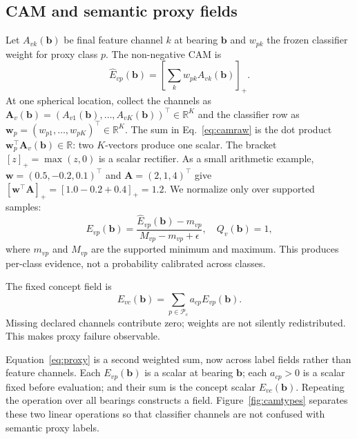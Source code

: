 \documentclass[a4paper,9pt]{extarticle}
\newcommand{\R}{\mathbb R}
\begin{document}
\subsection{CAM and semantic proxy fields}

Let $A_{vk}(\mathbf b)$ be final feature channel $k$ at bearing $\mathbf b$ and $w_{pk}$ the frozen classifier weight for proxy class $p$. The non-negative CAM is
\begin{equation}
 \widehat E_{vp}(\mathbf b)=
 \left[\sum_k w_{pk}A_{vk}(\mathbf b)\right]_+.
 \label{eq:camraw}
\end{equation}
At one spherical location, collect the channels as
$\mathbf A_v(\mathbf b)=(A_{v1}(\mathbf b),\ldots,A_{vK}(\mathbf b))^\top\in\R^K$ and the classifier
row as $\mathbf w_p=(w_{p1},\ldots,w_{pK})^\top\in\R^K$. The sum in
Eq.~\ref{eq:camraw} is the dot product
$\mathbf w_p^\top\mathbf A_v(\mathbf b)\in\R$: two $K$-vectors produce one scalar.
The bracket $[z]_+=\max(z,0)$ is a scalar rectifier. As a small arithmetic
example, $\mathbf w=(0.5,-0.2,0.1)^\top$ and
$\mathbf A=(2,1,4)^\top$ give
$[\mathbf w^\top\mathbf A]_+=[1.0-0.2+0.4]_+=1.2$.
We normalize only over supported samples:
\begin{equation}
 E_{vp}(\mathbf b)=
 \frac{\widehat E_{vp}(\mathbf b)-m_{vp}}
 {M_{vp}-m_{vp}+\epsilon}, \quad Q_v(\mathbf b)=1,
 \label{eq:camnorm}
\end{equation}
where $m_{vp}$ and $M_{vp}$ are the supported minimum and maximum. This produces per-class evidence, not a probability calibrated across classes.

The fixed concept field is
\begin{equation}
 E_{vc}(\mathbf b)=
 \sum_{p\in\mathcal P_c}a_{cp}E_{vp}(\mathbf b).
 \label{eq:proxy}
\end{equation}
Missing declared channels contribute zero; weights are not silently redistributed. This makes proxy failure observable.

Equation~\ref{eq:proxy} is a second weighted sum, now across label fields
rather than feature channels. Each $E_{vp}(\mathbf b)$ is a scalar at bearing
$\mathbf b$; each $a_{cp}>0$ is a scalar fixed before evaluation; and their
sum is the concept scalar $E_{vc}(\mathbf b)$. Repeating the operation over all
bearings constructs a field. Figure~\ref{fig:camtypes} separates these two
linear operations so that classifier channels are not confused with semantic
proxy labels.
\end{document}
